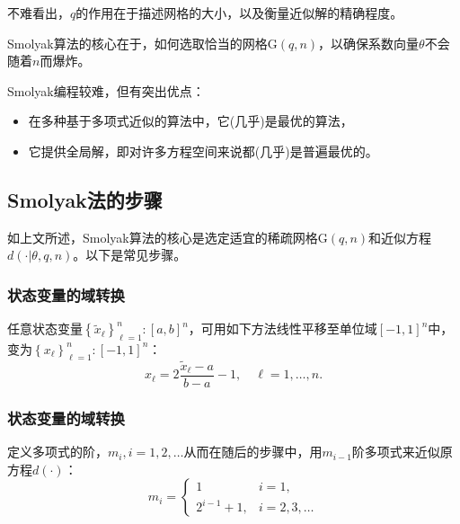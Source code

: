 不难看出，$q$的作用在于描述网格的大小，以及衡量近似解的精确程度。

Smolyak算法的核心在于，如何选取恰当的网格$\mathrm{G}(q,n)$，以确保系数向量$\theta$不会随着$n$而爆炸。

Smolyak编程较难，但有突出优点：
\begin{itemize}
  \item 在多种基于多项式近似的算法中，它(几乎)是最优的算法\citep{Barthelmann:2000bq}，
  \item 它提供全局解，即对许多方程空间来说都(几乎)是普遍最优的。
\end{itemize}

\subsection{Smolyak法的步骤}
\label{sec:pj-sparsity-steps}
如上文所述，Smolyak算法的核心是选定适宜的稀疏网格$\mathrm{G}(q,n)$和近似方程$d \left( \cdot | \theta, q, n\right)$。以下是常见步骤。

\subsubsection{状态变量的域转换}
\label{sec:pj-sparsity-steps-interval}
任意状态变量$\left\{ \tilde{x}_{\ell} \right\}_{\ell = 1}^{n}: \left[ a, b \right]^{n}$，可用如下方法线性平移至单位域$[-1,1]^{n}$中，变为$\left\{ x_{\ell} \right\}_{\ell = 1}^{n}: \left[ -1, 1 \right]^{n}$：
\begin{equation}
  \label{eq:pj-sparsity-steps-interval}
  x_{\ell} = 2 \frac{\tilde{x}_{\ell} - a}{b-a} -1, \quad \ell = 1, \ldots, n.
\end{equation}

\subsubsection{状态变量的域转换}
\label{sec:pj-sparsity-steps-poly-order}
定义多项式的阶，$m_{i}, i=1,2,\ldots$从而在随后的步骤中，用$m_{i-1}$阶多项式来近似原方程$d(\cdot)$：
\begin{equation}
  \label{eq:pj-sparsity-steps-poly-order}
  m_{i} = \begin{cases}
  1 & i = 1, \\
  2^{i-1} +1, & i=2,3,\ldots
  \end{cases}
\end{equation}

